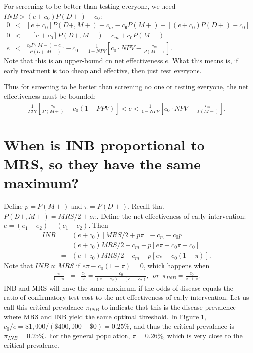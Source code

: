 \documentclass[11pt]{article}
\begin{document}
For screening to be better than testing everyone, we need $INB>(e+c_0)P(D+)-c_0$:
\begin{eqnarray*}
  0 &<& [e+c_0]P(D+,M+) - c_m - c_0P(M+) - [(e+c_0)P(D+)-c_0] \\
  0 &<&-[e+c_0]P(D+,M-) - c_m + c_0P(M-) \\
  e &<& \frac{c_0P(M-)-c_m}{P(D+,M-)} - c_0 = \frac{1}{1-NPV}\left[c_0\cdot NPV - \frac{c_m}{P(M-)}\right]. 
\end{eqnarray*}
Note that this is an upper-bound on net effectiveness $e$.  What this means is, if early treatment is too cheap and effective, then just test everyone.

Thus for screening to be better than screening no one or testing everyone, the net effectiveness must be bounded:
\begin{eqnarray*}
  \frac{1}{PPV}\left[\frac{c_m}{P(M+)}+c_0(1-PPV)\right] < e < \frac{1}{1-NPV}\left[c_0\cdot NPV - \frac{c_m}{P(M-)}\right]. 
\end{eqnarray*}

\section*{When is INB proportional to MRS, so they have the same maximum?}
\label{sec:INBandMRS}

Define $p=P(M+)$ and $\pi=P(D+)$.  Recall that $P(D+,M+) = MRS/2 +p\pi$.  Define the net effectiveness of early intervention: $e = (e_1-e_2)-(c_1-c_2)$.  Then
\begin{eqnarray*}
  INB &=& (e+c_0)[MRS/2 + p\pi] - c_m - c_0p \\
      &=& (e+c_0)MRS/2 - c_m + p[e\pi + c_0\pi - c_0] \\
      &=& (e+c_0)MRS/2 - c_m + p[e\pi - c_0(1-\pi)].
\end{eqnarray*}
Note that $INB\propto MRS$ if $e\pi - c_0(1-\pi)=0$, which happens when
\begin{eqnarray*}
  \frac{\pi}{1-\pi} &=& \frac{c_0}{e} = \frac{c_0}{(e_1-e_2)-(c_1-c_2)},~~or~~\pi_{INB}=\frac{c_0}{c_0+e}.
\end{eqnarray*}
INB and MRS will have the same maximum if the odds of disease equals the ratio of confirmatory test cost to the net effectiveness of early intervention.  Let us call this critical prevalence $\pi_{INB}$ to indicate that this is the disease prevalence where MRS and INB yield the same optimal threshold.  In Figure 1, $c_0/e = \$1,000/(\$400,000-\$0) = 0.25\%$, and thus the critical prevalence is $\pi_{INB}=0.25\%$.  For the general population, $\pi=0.26\%$, which is very close to the critical prevalence.  
\end{document}
